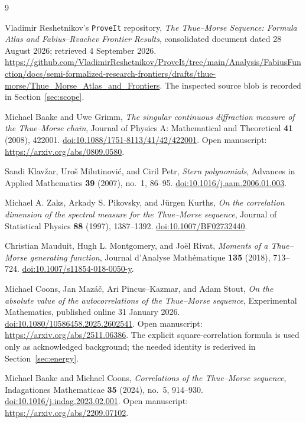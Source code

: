 \documentclass[11pt,a4paper]{article}
\numberwithin{equation}{section}
\theoremstyle{definition}
\theoremstyle{remark}
\begin{document}
\begin{thebibliography}{9}

Vladimir Reshetnikov's \texttt{ProveIt} repository,
\emph{The Thue--Morse Sequence: Formula Atlas and Fabius--Rvachev Frontier Results},
consolidated document dated 28 August 2026; retrieved 4 September 2026.
\url{https://github.com/VladimirReshetnikov/ProveIt/tree/main/Analysis/FabiusFunction/docs/semi-formalized-research-frontiers/drafts/thue-morse/Thue_Morse_Atlas_and_Frontiers}.
The inspected source blob is recorded in Section~\ref{sec:scope}.

Michael Baake and Uwe Grimm,
\emph{The singular continuous diffraction measure of the Thue--Morse chain},
Journal of Physics A: Mathematical and Theoretical \textbf{41} (2008), 422001.
\href{https://doi.org/10.1088/1751-8113/41/42/422001}{doi:10.1088/1751-8113/41/42/422001}.
Open manuscript: \url{https://arxiv.org/abs/0809.0580}.

Sandi Klav\v zar, Uro\v s Milutinovi\'c, and Ciril Petr,
\emph{Stern polynomials},
Advances in Applied Mathematics \textbf{39} (2007), no.~1, 86--95.
\href{https://doi.org/10.1016/j.aam.2006.01.003}{doi:10.1016/j.aam.2006.01.003}.

Michael A. Zaks, Arkady S. Pikovsky, and J\"urgen Kurths,
\emph{On the correlation dimension of the spectral measure for the Thue--Morse sequence},
Journal of Statistical Physics \textbf{88} (1997), 1387--1392.
\href{https://doi.org/10.1007/BF02732440}{doi:10.1007/BF02732440}.

Christian Mauduit, Hugh L. Montgomery, and Jo\"el Rivat,
\emph{Moments of a Thue--Morse generating function},
Journal d'Analyse Math\'ematique \textbf{135} (2018), 713--724.
\href{https://doi.org/10.1007/s11854-018-0050-y}{doi:10.1007/s11854-018-0050-y}.

Michael Coons, Jan Maz\'a\v c, Ari Pincus--Kazmar, and Adam Stout,
\emph{On the absolute value of the autocorrelations of the Thue--Morse sequence},
Experimental Mathematics, published online 31 January 2026.
\href{https://doi.org/10.1080/10586458.2025.2602541}{doi:10.1080/10586458.2025.2602541}.
Open manuscript: \url{https://arxiv.org/abs/2511.06386}.
The explicit square-correlation formula is used only as acknowledged background;
the needed identity is rederived in Section~\ref{sec:energy}.

Michael Baake and Michael Coons,
\emph{Correlations of the Thue--Morse sequence},
Indagationes Mathematicae \textbf{35} (2024), no.~5, 914--930.
\href{https://doi.org/10.1016/j.indag.2023.02.001}{doi:10.1016/j.indag.2023.02.001}.
Open manuscript: \url{https://arxiv.org/abs/2209.07102}.

\end{thebibliography}
\end{document}

